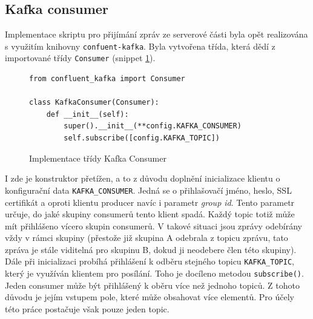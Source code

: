 \documentclass[thesis=M,czech,hidelinks]{FITthesis}[2013/05/06]
\begin{document}
\subsection{Kafka consumer} \label{sec:kafkaconsumer}
Implementace skriptu pro přijímání zpráv ze serverové části byla opět realizována s využitím knihovny \texttt{confuent-kafka}. Byla vytvořena třída, která dědí z importované třídy \texttt{Consumer} (snippet \ref{snip:kafkaconsumer}).
\begin{figure}[h]               
	\begin{verbatim}
from confluent_kafka import Consumer

class KafkaConsumer(Consumer):
    def __init__(self):
        super().__init__(**config.KAFKA_CONSUMER)
        self.subscribe([config.KAFKA_TOPIC])
	\end{verbatim}      
	\caption{Implementace třídy Kafka Consumer}
	\label{snip:kafkaconsumer}
\end{figure}
I zde je konstruktor přetížen, a to z důvodu doplnění inicializace klientu o konfigurační data \texttt{KAFKA_CONSUMER}. Jedná se o přihlašovačí jméno, heslo, SSL certifikát a oproti klientu producer navíc i parametr \textit{group id}. Tento parametr určuje, do jaké skupiny consumerů tento klient spadá. Každý topic totiž může mít přihlášeno vícero skupin consumerů. V takové situaci jsou zprávy odebírány vždy v rámci skupiny (přestože již skupina A odebrala z topicu zprávu, tato zpráva je stále viditelná pro skupinu B, dokud ji neodebere člen této skupiny). Dále při inicializaci probíhá přihlášení k odběru stejného topicu \texttt{KAFKA_TOPIC}, který je využíván klientem pro posílání. Toho je docíleno metodou \texttt{subscribe()}. Jeden consumer může být přihlášený k oběru více než jednoho topiců. Z tohoto důvodu je jejím vstupem pole, které může obsahovat více elementů. Pro účely této práce postačuje však pouze jeden topic.
\end{document}
